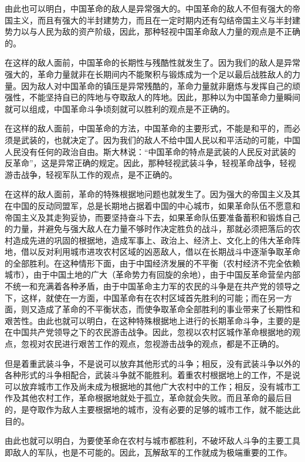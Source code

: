由此也可以明白，中国革命的敌人是异常强大的。中国革命的敌人不但有强大的帝国主义，而且有强大的半封建势力，而且在一定时期内还有勾结帝国主义与半封建势力以与人民为敌的资产阶级，因此，那种轻视中国革命敌人力量的观点是不正确的。

在这样的敌人面前，中国革命的长期性与残酷性就发生了。因为我们的敌人是异常强大的，革命力量就非在长期间内不能聚积与锻炼成为一个足以最后战胜敌人的力量。因为敌人对中国革命的镇压是异常残酷的，革命力量就非磨炼与发挥自己的顽强性，不能坚持自已的阵地与夺取敌人的阵地。因此，那种以为中国革命力量瞬间就可以组成，中国革命斗争顷刻就可以胜利的观点是不正确的。

在这样的敌人面前，中国革命的方法，中国革命的主要形式，不能是和平的，而必须是武装的，也就决定了。因为我们的敌人不给中国人民以和平活动的可能，中国人民没有任何的政治自由。斯大林说：“中国革命的特点是武装的人民反对武装的反革命”，这是异常正确的规定。因此，那种轻视武装斗争，轻视革命战争，轻视游击战争，轻视军队工作的观点，是不正确的。

在这样的敌人面前，革命的特殊根据地问题也就发生了。因为强大的帝国主义及其在中国的反动同盟军，总是长期地占据着中国的中心城市，如果革命队伍不愿意和帝国主义及其走狗妥协，而要坚持奋斗下去，如果革命队伍要准备蓄积和锻炼自己的力量，并避免与强大敌人在力量不够时作决定胜负的战斗，那就必须把落后的农村造成先进的巩固的根据地，造成军事上、政治上、经济上、文化上的伟大革命阵地，借以反对利用城市进攻农村区域的凶恶敌人，借以在长期战斗中逐渐争取革命的全部胜利。在这种情形下面，由于中国经济发展的不平衡（农村经济不完全依赖城市），由于中国土地的广大（革命势力有回旋的余地），由于中国反革命营垒内部不统一和充满着各种矛盾，由于中国革命主力军的农民的斗争是在共产党的领导之下，这样，就使在一方面，中国革命有在农村区域首先胜利的可能；而在另一方面，则又造成了革命的不平衡状态，而使争取革命全部胜利的事业带来了长期性和艰苦性。由此也就可以明白，在这种特殊根据地上进行的长期革命斗争，主要的是在中国共产党领导之下的农民游击战争。因此，忽视以农村区城作革命根据地的观点，忽视对农民进行艰苦工作的观点，忽视游击战争的观点，都是不正确的。

但是着重武装斗争，不是说可以放弃其他形式的斗争；相反，没有武装斗争以外的各种形式的斗争相配合，武装斗争就不能胜利。着重农村根据地上的工作，不是说可以放弃城市工作及尚未成为根据地的其他广大农村中的工作；相反，没有城市工作及其他农村工作，革命根据地就处于孤立，革命就会失败。而且革命的最后目的，是夺取作为敌人主要根据地的城市，没有必要的足够的城市工作，就不能达此目的。

由此也就可以明白，为要使革命在农村与城市都胜利，不破坏敌人斗争的主要工具即敌人的军队，也是不可能的。因此，瓦解敌军的工作就成为极端重要的工作。

